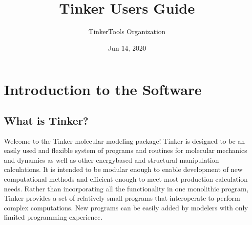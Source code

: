\documentclass[letterpaper,11pt,english]{sphinxmanual}
\title{Tinker User\textquotesingle{}s Guide}
\date{Jun 14, 2020}
\author{TinkerTools Organization}
\begin{document}
\pagestyle{empty}
\sphinxmaketitle
\pagestyle{plain}
\sphinxtableofcontents
\pagestyle{normal}
\label{\detokenize{index::doc}}



\chapter{Introduction to the Software}
\label{\detokenize{text/introduction:introduction-to-the-software}}\label{\detokenize{text/introduction::doc}}

\section{What is Tinker?}
\label{\detokenize{text/introduction:what-is-tinker}}
Welcome to the Tinker molecular modeling package! Tinker is designed to be an easily used and flexible system of programs and routines for molecular mechanics and dynamics as well as other energy\sphinxhyphen{}based and structural manipulation calculations. It is intended to be modular enough to enable development of new computational methods and efficient enough to meet most production calculation needs. Rather than incorporating all the functionality in one monolithic program, Tinker provides a set of relatively small programs that interoperate to perform complex computations. New programs can be easily added by modelers with only limited programming experience.
\end{document}
